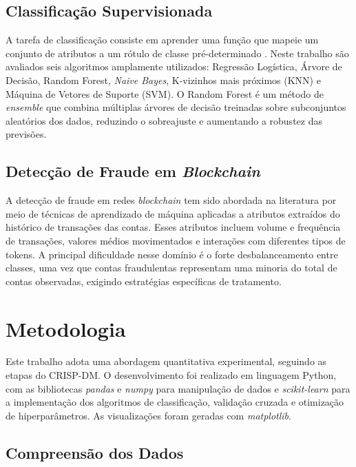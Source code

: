 \documentclass[12pt]{article}
\begin{document}
\subsection{Classificação Supervisionada}

A tarefa de classificação consiste em aprender uma função que mapeie um
conjunto de atributos a um rótulo de classe pré-determinado
\cite{tan2009}. Neste trabalho são avaliados seis algoritmos
amplamente utilizados: Regressão Logística, Árvore de Decisão, Random
Forest, \textit{Naive Bayes}, K-vizinhos mais próximos (KNN) e Máquina
de Vetores de Suporte (SVM). O Random Forest é um método de
\textit{ensemble} que combina múltiplas árvores de decisão treinadas
sobre subconjuntos aleatórios dos dados, reduzindo o sobreajuste e
aumentando a robustez das previsões.

\subsection{Detecção de Fraude em \textit{Blockchain}}

A detecção de fraude em redes \textit{blockchain} tem sido abordada na
literatura por meio de técnicas de aprendizado de máquina aplicadas a
atributos extraídos do histórico de transações das contas. Esses
atributos incluem volume e frequência de transações, valores médios
movimentados e interações com diferentes tipos de tokens. A principal
dificuldade nesse domínio é o forte desbalanceamento entre classes,
uma vez que contas fraudulentas representam uma minoria do total de
contas observadas, exigindo estratégias específicas de tratamento.

\section{Metodologia}

Este trabalho adota uma abordagem quantitativa experimental, seguindo
as etapas do CRISP-DM. O desenvolvimento foi realizado em linguagem
Python, com as bibliotecas \textit{pandas} e \textit{numpy} para
manipulação de dados e \textit{scikit-learn} para a implementação dos
algoritmos de classificação, validação cruzada e otimização de
hiperparâmetros. As visualizações foram geradas com \textit{matplotlib}.

\subsection{Compreensão dos Dados}
\end{document}
